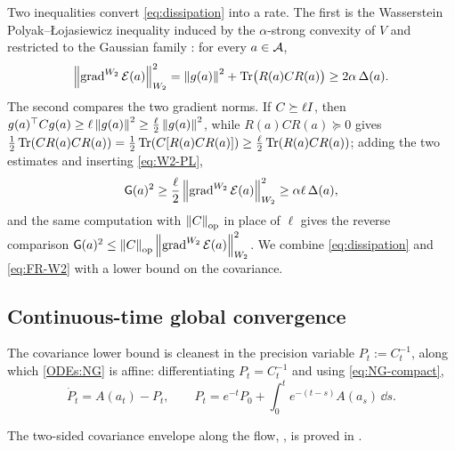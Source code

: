 Two inequalities convert \eqref{eq:dissipation} into a rate. The first is the Wasserstein
Polyak--{\L}ojasiewicz inequality induced by the $\alpha$-strong convexity of $V$ and
restricted to the Gaussian family \citep{lambert2022variational}: for every $a\in\mathcal{A}$,
\begin{equation}\label{eq:W2-PL}
    \left\lVert \operatorname{grad}^{W_2}\mathcal{E}(a)\right\rVert_{W_2}^2
    =
    \left\lVert g(a)\right\rVert^2+\operatorname{Tr}\bigl(R(a)CR(a)\bigr)
    \geq
    2\alpha\,\Delta(a).
\end{equation}
The second compares the two gradient norms. If $C\succeq\ell I$, then
$g(a)^\top Cg(a)\geq\ell\left\lVert g(a)\right\rVert^2\geq\tfrac\ell2\left\lVert g(a)\right\rVert^2$, while
$R(a)CR(a)\succeq0$ gives
$\tfrac12\operatorname{Tr}(CR(a)CR(a))=\tfrac12\operatorname{Tr}(C[R(a)CR(a)])\geq\tfrac\ell2\operatorname{Tr}(R(a)CR(a))$; adding the
two estimates and inserting \eqref{eq:W2-PL},
\begin{equation}\label{eq:FR-W2}
    \mathsf{G}(a)^2
    \geq
    \frac\ell2\left\lVert \operatorname{grad}^{W_2}\mathcal{E}(a)\right\rVert_{W_2}^2
    \geq
    \alpha\ell\,\Delta(a),
\end{equation}
and the same computation with $\left\lVert C\right\rVert_{\mathrm{op}}$ in place of $\ell$ gives the reverse comparison
$\mathsf{G}(a)^2\leq\left\lVert C\right\rVert_{\mathrm{op}}\left\lVert \operatorname{grad}^{W_2}\mathcal{E}(a)\right\rVert_{W_2}^2$. We combine \eqref{eq:dissipation} and \eqref{eq:FR-W2} with a lower bound on the
covariance.

\subsection{Continuous-time global convergence}

The covariance lower bound is cleanest in the precision variable $P_t:=C_t^{-1}$, along which
\eqref{ODEs:NG} is affine: differentiating $P_t=C_t^{-1}$ and using \eqref{eq:NG-compact},
\begin{equation}\label{eq:precision-duhamel}
    \dot P_t=A(a_t)-P_t,
    \qquad
    P_t=e^{-t}P_0+\int_0^te^{-(t-s)}A(a_s)\,\dd s .
\end{equation}

The two-sided covariance envelope along the flow, , is proved in
.

